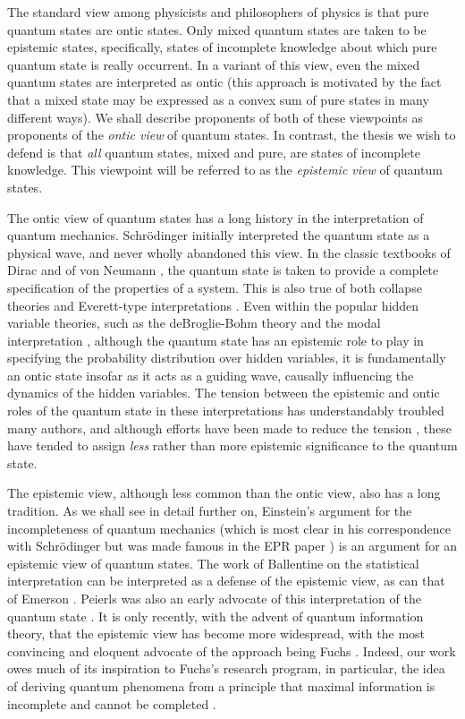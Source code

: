 \documentclass[pra,nofootinbib,showpacs,12pt]{revtex4}
\begin{document}
The standard view among physicists and philosophers of physics is that pure
quantum states are ontic states. Only mixed quantum states are taken to be
epistemic states, specifically, states of incomplete knowledge about which
pure quantum state is really occurrent. In a variant of this view, even the
mixed quantum states are interpreted as ontic (this approach is motivated by
the fact that a mixed state may be expressed as a convex sum of pure states
in many different ways). We shall describe proponents of both of these
viewpoints as proponents of the \emph{ontic view} of quantum states. In
contrast, the thesis we wish to defend is that \emph{all }quantum states,
mixed and pure, are states of incomplete knowledge. This viewpoint will be
referred to as the \emph{epistemic view} of quantum states.

The ontic view of quantum states has a long history in the interpretation of
quantum mechanics. Schr\"{o}dinger initially interpreted the quantum state
as a physical wave, and never wholly abandoned this view. In the classic
textbooks of Dirac \cite{Dirac} and of von Neumann \cite{vonNeumann}, the
quantum state is taken to provide a complete specification of the properties
of a system. This is also true of both collapse theories \cite%
{GRW,Pearle,review} and Everett-type interpretations \cite{Everett,Barrett}.
Even within the popular hidden variable theories, such as the deBroglie-Bohm
theory \cite{BohmHiley,Holland,Valentini} and the modal interpretation \cite%
{KDH,DieksVermaas,Bacciagaluppi}, although the quantum state has an
epistemic role to play in specifying the probability distribution over
hidden variables, it is fundamentally an ontic state insofar as it acts as a
guiding wave, causally influencing the dynamics of the hidden variables. The
tension between the epistemic and ontic roles of the quantum state in these
interpretations has understandably troubled many authors, and although
efforts have been made to reduce the tension \cite{Valentini}, these have
tended to assign \emph{less} rather than more epistemic significance to the
quantum state.

The epistemic view, although less common than the ontic view, also
has a long tradition. As we shall see in detail further on,
Einstein's argument for the incompleteness of quantum mechanics
(which is most clear in his correspondence with Schr\"{o}dinger
\cite{Einsteinletters} but was made famous in the EPR paper
\cite{EPR}) is an argument for an epistemic view of quantum
states. The work of Ballentine on the statistical interpretation
\cite{BallentineRMP,Ballentine} can be interpreted as a defense of
the epistemic view, as can that of Emerson \cite{Emerson}. Peierls
was also an early advocate of this interpretation of the quantum
state \cite{Peierls}. It is only recently, with the advent of
quantum information theory, that the epistemic view has become
more widespread, with the most convincing and eloquent advocate of
the approach being Fuchs \cite{Fuchs}. Indeed, our work owes much
of its inspiration to Fuchs's research program, in particular, the
idea of deriving quantum phenomena from a principle that maximal
information is incomplete and cannot be completed
\cite{Fuchscloning,Fuchssamizdat}.
\end{document}
